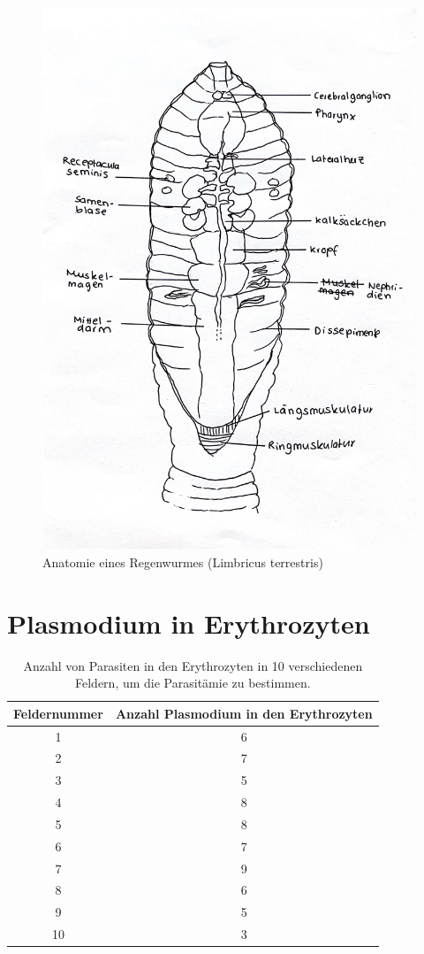 \documentclass[oneside,10pt,a4paper]{report}
\begin{document}
		\begin{figure}[H]
			\centering
			\includegraphics[scale=0.25]{Regenwurm.JPG}
			\caption{Anatomie eines Regenwurmes (Limbricus terrestris)}
			\label{fig:Regenwurm_ana}
		\end{figure}
		
		\section{Plasmodium in Erythrozyten}
				\begin{table}[H]
				\centering
				\caption{Anzahl von Parasiten in den Erythrozyten in 10 verschiedenen Feldern, um die Parasitämie zu bestimmen.}
				\label{tab: Eryzahl}
				\begin{tabular}{cc}
					\toprule
					Feldernummer & Anzahl Plasmodium in den Erythrozyten\\
					\midrule
					1 & 6 \\
					2 & 7 \\
					3 & 5 \\
					4 & 8 \\
					5 & 8 \\
					6 & 7 \\
					7 & 9 \\
					8 & 6 \\
					9 & 5 \\
					10 & 3 \\
					\bottomrule			
				\end{tabular}
			\end{table}
		
		
		
		
	
	\nocite{*}
	
	\newpage
\end{document}
